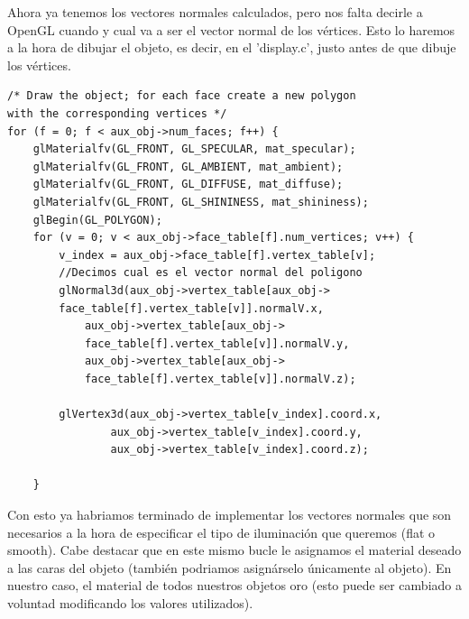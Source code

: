 \documentclass[12pt,a4paper]{article}
\begin{document}
\begin{enumerate}
\begin{enumerate}
\begin{enumerate}
Ahora ya tenemos los vectores normales calculados, pero nos falta decirle a OpenGL cuando y cual va a ser el vector normal de los vértices. Esto lo haremos a la hora de dibujar el objeto, es decir, en el 'display.c', justo antes de que dibuje los vértices.

\begin{lstlisting}
/* Draw the object; for each face create a new polygon 
with the corresponding vertices */
for (f = 0; f < aux_obj->num_faces; f++) {
    glMaterialfv(GL_FRONT, GL_SPECULAR, mat_specular);
    glMaterialfv(GL_FRONT, GL_AMBIENT, mat_ambient);
    glMaterialfv(GL_FRONT, GL_DIFFUSE, mat_diffuse);
    glMaterialfv(GL_FRONT, GL_SHININESS, mat_shininess);
    glBegin(GL_POLYGON);
    for (v = 0; v < aux_obj->face_table[f].num_vertices; v++) {
        v_index = aux_obj->face_table[f].vertex_table[v];
        //Decimos cual es el vector normal del poligono
        glNormal3d(aux_obj->vertex_table[aux_obj->
        face_table[f].vertex_table[v]].normalV.x,
            aux_obj->vertex_table[aux_obj->
            face_table[f].vertex_table[v]].normalV.y,
            aux_obj->vertex_table[aux_obj->
            face_table[f].vertex_table[v]].normalV.z);
            
        glVertex3d(aux_obj->vertex_table[v_index].coord.x,
                aux_obj->vertex_table[v_index].coord.y,
                aux_obj->vertex_table[v_index].coord.z);

    }
\end{lstlisting}
Con esto ya habriamos terminado de implementar los vectores normales que son necesarios a la hora de especificar el tipo de iluminación que queremos (flat o smooth).\newline
Cabe destacar que en este mismo bucle le asignamos el material deseado a las caras del objeto (también podriamos asignárselo únicamente al objeto). En nuestro caso, el material de todos nuestros objetos oro (esto puede ser cambiado a voluntad modificando los valores utilizados).
\end{enumerate}


\end{enumerate}
\end{enumerate}
\end{document}
